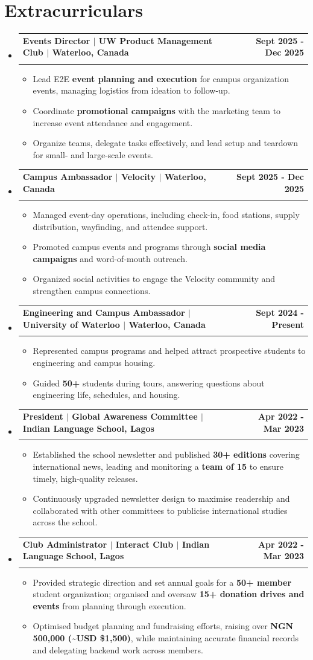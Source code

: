 \documentclass[letterpaper,11pt]{article}
\makeatletter
\newcommand{\resumeItem}[1]{
  \item\small{
    {#1 \vspace{-1pt}}
  }
}
\newcommand{\resumeSubheading}[4]{
  \vspace{-1pt}\item
    \begin{tabular*}{1.0\textwidth}[t]{l@{\extracolsep{\fill}}r}
      \textbf{#1} & \textbf{\small #2} \\
      \textit{\small#3} & \textit{\small #4} \\[-2pt]
    \end{tabular*}\vspace{-1pt}
}
\newcommand{\resumeSubHeadingListStart}{\begin{itemize}[leftmargin=0.0in, label={}]}
\newcommand{\resumeSubHeadingListEnd}{\end{itemize}}
\newcommand{\resumeItemListStart}{\begin{itemize}[leftmargin=0.15in, topsep=2pt, itemsep=1pt, parsep=0pt, partopsep=0pt]}
\newcommand{\resumeItemListEnd}{\end{itemize}\vspace{-1pt}}
\makeatother
\begin{document}
\section{Extracurriculars}
  \resumeSubHeadingListStart
    \resumeSubheading
      {Events Director $|$ UW Product Management Club $|$ Waterloo, Canada}{Sept 2025 - Dec 2025}
      {}{}
      \resumeItemListStart
        \resumeItem{Lead E2E \textbf{event planning and execution} for campus organization events, managing logistics from ideation to follow-up.}
        \resumeItem{Coordinate \textbf{promotional campaigns} with the marketing team to increase event attendance and engagement.}
        \resumeItem{Organize teams, delegate tasks effectively, and lead setup and teardown for small- and large-scale events.}
      \resumeItemListEnd
      \vspace{-3pt}
    \resumeSubheading
      {Campus Ambassador $|$ Velocity $|$ Waterloo, Canada}{Sept 2025 - Dec 2025}
      {}{}
      \resumeItemListStart
        \resumeItem{Managed event-day operations, including check-in, food stations, supply distribution, wayfinding, and attendee support.}
        \resumeItem{Promoted campus events and programs through \textbf{social media campaigns} and word-of-mouth outreach.}
        \resumeItem{Organized social activities to engage the Velocity community and strengthen campus connections.}
      \resumeItemListEnd
      \vspace{-3pt}
    \resumeSubheading
      {Engineering and Campus Ambassador $|$ University of Waterloo $|$ Waterloo, Canada}{Sept 2024 - Present}
      {}{}
      \resumeItemListStart
        \resumeItem{Represented campus programs and helped attract prospective students to engineering and campus housing.}
        \resumeItem{Guided \textbf{50+} students during tours, answering questions about engineering life, schedules, and housing.}
      \resumeItemListEnd
      \vspace{-3pt}
    \resumeSubheading
      {President $|$ Global Awareness Committee $|$ Indian Language School, Lagos}{Apr 2022 - Mar 2023}
      {}{}
      \resumeItemListStart
        \resumeItem{Established the school newsletter and published \textbf{30+ editions} covering international news, leading and monitoring a \textbf{team of 15} to ensure timely, high-quality releases.}
        \resumeItem{Continuously upgraded newsletter design to maximise readership and collaborated with other committees to publicise international studies across the school.}
      \resumeItemListEnd
      \vspace{-3pt}
    \resumeSubheading
      {Club Administrator $|$ Interact Club $|$ Indian Language School, Lagos}{Apr 2022 - Mar 2023}
      {}{}
      \resumeItemListStart
        \resumeItem{Provided strategic direction and set annual goals for a \textbf{50+ member} student organization; organised and oversaw \textbf{15+ donation drives and events} from planning through execution.}
        \resumeItem{Optimised budget planning and fundraising efforts, raising over \textbf{NGN 500,000 (\textasciitilde{}USD \$1,500)}, while maintaining accurate financial records and delegating backend work across members.}
      \resumeItemListEnd
  \resumeSubHeadingListEnd
\vspace{-4pt}
\end{document}
